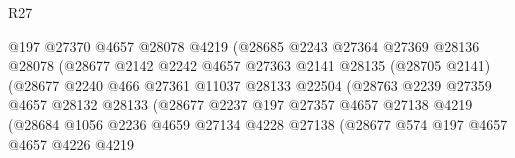 \begin{lexlean}{R27}
\begin{coremodule}
                                    @197
                                    @27370
                                    @4657
                                    @28078
                                    @4219
                                    (@28685
                                      @2243
                                      @27364
                                      @27369
                                      @28136
                                      @28078
                                      (@28677
                                        @2142
                                        @2242
                                        @4657
                                        @27363
                                        @2141
                                        @28135
                                        (@28705 @2141)
                                        (@28677
                                          @2240
                                          @466
                                          @27361
                                          @11037
                                          @28133
                                          @22504
                                          (@28763
                                            @2239
                                            @27359
                                            @4657
                                            @28132
                                            @28133
                                            (@28677
                                              @2237
                                              @197
                                              @27357
                                              @4657
                                              @27138
                                              @4219
                                              (@28684
                                                @1056
                                                @2236
                                                @4659
                                                @27134
                                                @4228
                                                @27138
                                                (@28677
                                                  @574
                                                  @197
                                                  @4657
                                                  @4657
                                                  @4226
                                                  @4219

\end{coremodule}
\end{lexlean}
